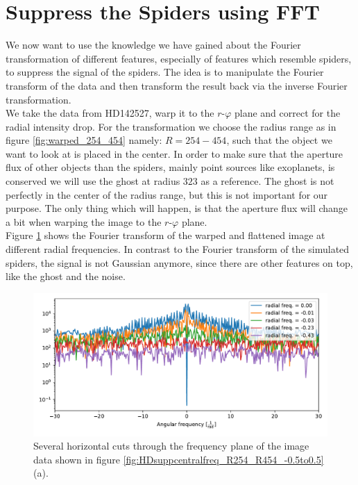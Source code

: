 \section{Suppress the Spiders using FFT}
\label{sec:suppression}
We now want to use the knowledge we have gained about the Fourier transformation of different features, especially of features which resemble spiders, to suppress the signal of the spiders. The idea is to manipulate the Fourier transform of the data and then transform the result back via the inverse Fourier transformation.\\
We take the data from HD142527, warp it to the $r$-$\varphi$ plane and correct for the radial intensity drop. For the transformation we choose the radius range as in figure \ref{fig:warped_254_454} namely: $R=254-454$, such that the object we want to look at is placed in the center. In order to make sure that the aperture flux of other objects than the spiders, mainly point sources like exoplanets, is conserved we will use the ghost at radius $323$ as a reference. The ghost is not perfectly in the center of the radius range, but this is not important for our purpose. The only thing which will happen, is that the aperture flux will change a bit when warping the image to the $r$-$\varphi$ plane.\\
Figure \ref{fig:rad0} shows the Fourier transform of the warped and flattened image at different radial frequencies. In contrast to the Fourier transform of the simulated spiders, the signal is not Gaussian anymore, since there are other features on top, like the ghost and the noise.
\begin{figure}[H]
	\centering
		\includegraphics[width=1.0\textwidth]{pics/rad0.pdf}
		\caption{Several horizontal cuts through the frequency plane of the image data shown in figure \ref{fig:HDsuppcentralfreq_R254_R454_-0.5to0.5}(a).}
		\label{fig:rad0}
\end{figure} 

